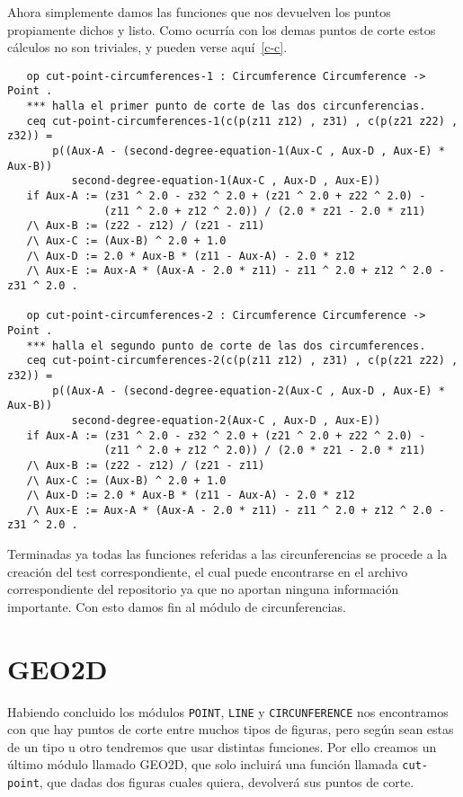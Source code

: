 Ahora simplemente damos las funciones que nos devuelven los puntos propiamente dichos y listo. Como ocurría con los demas puntos de corte estos cálculos no son triviales, y pueden verse aquí~\ref{c-c}. 
{\codesize
\begin{verbatim}
   op cut-point-circumferences-1 : Circumference Circumference -> Point .
   *** halla el primer punto de corte de las dos circunferencias.
   ceq cut-point-circumferences-1(c(p(z11 z12) , z31) , c(p(z21 z22) , z32)) = 
       p((Aux-A - (second-degree-equation-1(Aux-C , Aux-D , Aux-E) * Aux-B))  
          second-degree-equation-1(Aux-C , Aux-D , Aux-E))
   if Aux-A := (z31 ^ 2.0 - z32 ^ 2.0 + (z21 ^ 2.0 + z22 ^ 2.0) - 
               (z11 ^ 2.0 + z12 ^ 2.0)) / (2.0 * z21 - 2.0 * z11) 
   /\ Aux-B := (z22 - z12) / (z21 - z11) 
   /\ Aux-C := (Aux-B) ^ 2.0 + 1.0
   /\ Aux-D := 2.0 * Aux-B * (z11 - Aux-A) - 2.0 * z12
   /\ Aux-E := Aux-A * (Aux-A - 2.0 * z11) - z11 ^ 2.0 + z12 ^ 2.0 - z31 ^ 2.0 .

   op cut-point-circumferences-2 : Circumference Circumference -> Point .
   *** halla el segundo punto de corte de las dos circumferences.
   ceq cut-point-circumferences-2(c(p(z11 z12) , z31) , c(p(z21 z22) , z32)) = 
       p((Aux-A - (second-degree-equation-2(Aux-C , Aux-D , Aux-E) * Aux-B))  
          second-degree-equation-2(Aux-C , Aux-D , Aux-E))
   if Aux-A := (z31 ^ 2.0 - z32 ^ 2.0 + (z21 ^ 2.0 + z22 ^ 2.0) -
               (z11 ^ 2.0 + z12 ^ 2.0)) / (2.0 * z21 - 2.0 * z11) 
   /\ Aux-B := (z22 - z12) / (z21 - z11) 
   /\ Aux-C := (Aux-B) ^ 2.0 + 1.0
   /\ Aux-D := 2.0 * Aux-B * (z11 - Aux-A) - 2.0 * z12
   /\ Aux-E := Aux-A * (Aux-A - 2.0 * z11) - z11 ^ 2.0 + z12 ^ 2.0 - z31 ^ 2.0 .
\end{verbatim}
}

Terminadas ya todas las funciones referidas a las circunferencias se procede a la creación del test correspondiente, el cual puede encontrarse en el archivo correspondiente del repositorio ya que no aportan ninguna información importante. Con esto damos fin al módulo de circunferencias.\par

\section{GEO2D}

Habiendo concluido los módulos \texttt{POINT}, \texttt{LINE} y \texttt{CIRCUNFERENCE} nos encontramos con que hay puntos de corte entre muchos tipos de figuras, pero según sean estas de un tipo u otro tendremos que usar distintas funciones. Por ello creamos un último módulo llamado GEO2D, que solo incluirá una función llamada \texttt{cut-point}, que dadas dos figuras cuales quiera, devolverá sus puntos de corte. \par

